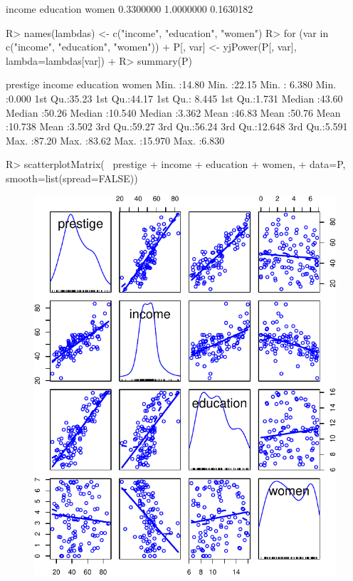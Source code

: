 \documentclass[
]{jss}
\begin{document}
\begin{CodeChunk}
\begin{CodeOutput}
   income education     women 
0.3300000 1.0000000 0.1630182 
\end{CodeOutput}
\begin{CodeInput}
R> names(lambdas) <- c("income", "education", "women")
R> for (var in c("income", "education", "women")){
+   P[, var] <- yjPower(P[, var], lambda=lambdas[var])
+ }
R> summary(P)
\end{CodeInput}
\begin{CodeOutput}
    prestige         income        education          women      
 Min.   :14.80   Min.   :22.15   Min.   : 6.380   Min.   :0.000  
 1st Qu.:35.23   1st Qu.:44.17   1st Qu.: 8.445   1st Qu.:1.731  
 Median :43.60   Median :50.26   Median :10.540   Median :3.362  
 Mean   :46.83   Mean   :50.76   Mean   :10.738   Mean   :3.502  
 3rd Qu.:59.27   3rd Qu.:56.24   3rd Qu.:12.648   3rd Qu.:5.591  
 Max.   :87.20   Max.   :83.62   Max.   :15.970   Max.   :6.830  
\end{CodeOutput}
\begin{CodeInput}
R> scatterplotMatrix(~ prestige + income + education + women,
+                   data=P, smooth=list(spread=FALSE))
\end{CodeInput}
\begin{figure}

{\centering \includegraphics[width=1\linewidth]{JSS-article-reduced_files/figure-latex/transformed-predictors-1} 

}
\end{figure}
\end{CodeChunk}
\end{document}
